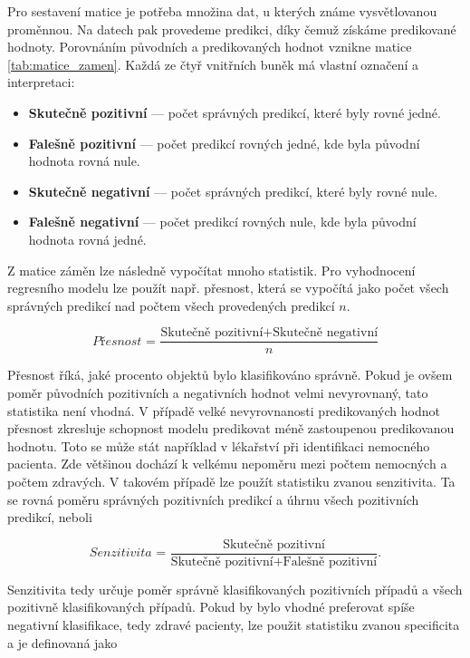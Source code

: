Pro sestavení matice je potřeba množina dat, u kterých známe vysvětlovanou proměnnou. Na datech pak provedeme predikci, díky čemuž získáme predikované hodnoty. Porovnáním
původních a predikovaných hodnot vznikne matice \ref{tab:matice_zamen}. Každá ze čtyř vnitřních buněk má vlastní označení a interpretaci:

\begin{itemize}
    \item \textbf{Skutečně pozitivní} --- počet správných predikcí, které byly rovné jedné.
    \item \textbf{Falešně pozitivní} --- počet predikcí rovných jedné, kde byla původní hodnota rovná nule.
    \item \textbf{Skutečně negativní} --- počet správných predikcí, které byly rovné nule.
    \item \textbf{Falešně negativní} --- počet predikcí rovných nule, kde byla původní hodnota rovná jedné.
\end{itemize}

Z matice záměn lze následně vypočítat mnoho statistik. Pro vyhodnocení regresního modelu lze použít např. přesnost, která se vypočítá jako počet všech správných predikcí nad
počtem všech provedených predikcí $n$.

\begin{equation}
    \textit{Přesnost = } \frac{\text{Skutečně pozitivní} + \text{Skutečně negativní}}{n}
\end{equation}


Přesnost říká, jaké procento objektů bylo klasifikováno správně. Pokud je ovšem poměr původních pozitivních a negativních hodnot velmi nevyrovnaný,
tato statistika není vhodná. V případě velké nevyrovnanosti predikovaných hodnot přesnost zkresluje schopnost modelu predikovat méně zastoupenou predikovanou hodnotu. 
Toto se může stát například v lékařství při identifikaci nemocného pacienta. Zde většinou dochází k velkému nepoměru mezi počtem nemocných a počtem zdravých.
V takovém případě lze použít statistiku zvanou senzitivita. Ta se rovná poměru správných pozitivních predikcí a úhrnu všech pozitivních predikcí, neboli

\begin{equation}
    \textit{Senzitivita = } \frac{\text{Skutečně pozitivní}}{\text{Skutečně pozitivní} + \text{Falešně pozitivní}}.
\end{equation}

Senzitivita tedy určuje poměr správně klasifikovaných pozitivních případů a všech pozitivně klasifikovaných případů. Pokud by bylo vhodné preferovat
spíše negativní klasifikace, tedy zdravé pacienty, lze použit statistiku zvanou specificita a je definovaná jako

